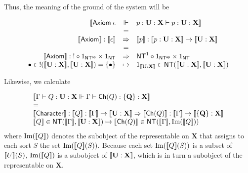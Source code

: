 Thus, the meaning of the ground of the system will be

$$\begin{array}{rcl}
  \ldb \mathsf{Axiom}\; \epsilon & \Vdash & p : \mathbf{U} : \mathbf {X} \vdash p : \mathbf{U} : \mathbf {X} \rdb \\
  & = & \\
  \meaningof{\mathsf{Axiom}} : \meaningof{\epsilon} & \Rightarrow & \meaningof{p} : \meaningof{p : \mathbf{U : X}} \to \meaningof{\mathbf{U : X}} \\
 & = & \\
  \meaningof{\mathsf{Axiom}} : \mathsf{!} \circ \mathsf{1}_{\mathsf{NT^{op}}} \times \mathsf{1}_{\mathsf{NT}} & \Rightarrow & \mathsf{NT}^{1} \circ \mathsf{1}_{\mathsf{NT^{op}}} \times \mathsf{1}_{\mathsf{NT}} \\
	\bullet \in \, !(\meaningof{\mathbf{U} : \mathbf{X}}, \meaningof{\mathbf{U} : \mathbf{X}}) = \{\bullet \}& \mapsto & 1_{\meaningof{\mathbf{U} : \mathbf{X}}} \in \mathsf{NT}(\meaningof{\mathbf{U} : \mathbf{X}}, \meaningof{\mathbf{U} : \mathbf{X}})
\end{array}$$

Likewise, we calculate

$$\begin{array}{l}
  \meaningof{\Gamma \vdash Q : \mathbf{U} : \mathbf {X} \Vdash \Gamma \vdash \mathsf{Ch}(Q) : \mathbf{\{ Q \}} : \mathbf {X}} \\
  = \\
  \meaningof{\mathsf{Character}} : \meaningof{Q} : \meaningof{\Gamma} \to \meaningof{\mathbf{U} : \mathbf{X}} \Rightarrow \meaningof{\mathsf{Ch}(Q)} : \meaningof{\Gamma} \to \meaningof{\mathbf{\{ Q \}} : \mathbf {X}} \\
	\meaningof{Q}\in \mathsf{NT}(\meaningof{\Gamma}, \meaningof{\mathbf{U} : \mathbf{X}}) \mapsto \meaningof{\mathsf{Ch}(Q)} \in \mathsf{NT}(\meaningof{\Gamma}, {\rm Im}(\meaningof{Q}))
\end{array}$$
where ${\rm Im}([\![ Q ]\!])$ denotes the subobject of the representable on $\mathbf{X}$ that assigns to each sort $S$ the set ${\rm Im}([\![ Q ]\!](S)).$  Because each set ${\rm Im}([\![ Q ]\!](S))$ is a subset of $[\![ U ]\!](S)$, ${\rm Im}([\![ Q ]\!])$ is a subobject of $[\![ \mathbf{U} : \mathbf{X} ]\!]$, which is in turn a subobject of the representable on $\mathbf{X}$.

